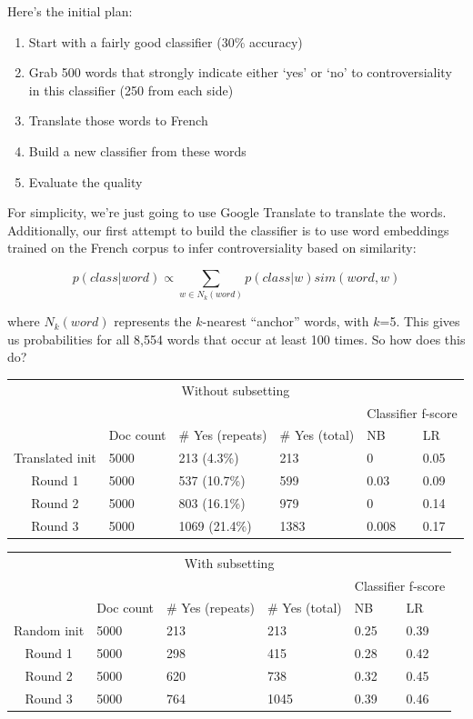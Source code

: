 \documentclass[11pt]{article} %
\begin{document}
Here's the initial plan:
\begin{enumerate}
\item Start with a fairly good classifier (30\% accuracy)
\item Grab 500 words that strongly indicate either `yes' or `no' to controversiality in this classifier (250 from each side) 
\item Translate those words to French
\item Build a new classifier from these words
\item Evaluate the quality
\end{enumerate}

For simplicity, we're just going to use Google Translate to translate the words. Additionally, our first attempt to build the classifier is to use word embeddings trained on the French corpus to infer controversiality based on similarity:

\[ p(class|word) \propto \sum_{w\in N_k(word)} p(class|w) sim(word,w) \]

where $N_k(word)$ represents the $k$-nearest ``anchor'' words, with $k$=5. This gives us probabilities for all 8,554 words that occur at least 100 times. So how does this do?\\

\begin{tabular}{|c|l|l|l|l|l|}
\multicolumn{6}{|c|}{Without subsetting} \\
\rowcolor{gray!50} &&&& \multicolumn{2}{|c|}{Classifier f-score} \\
\rowcolor{gray!50} & Doc count & \# Yes (repeats) & \# Yes (total) & NB & LR \\
Translated init & 5000 & 213 (4.3\%) & 213 & 0 & 0.05 \\
Round 1 & 5000 &  537 (10.7\%) & 599 & 0.03 & 0.09 \\
Round 2 & 5000 &  803 (16.1\%) & 979 & 0 & 0.14 \\
Round 3 & 5000 & 1069 (21.4\%) & 1383 & 0.008 & 0.17 \\
\end{tabular}
\quad
\begin{tabular}{|c|l|l|l|l|l|}
\multicolumn{6}{|c|}{With subsetting} \\
\rowcolor{gray!50} &&&& \multicolumn{2}{|c|}{Classifier f-score} \\
\rowcolor{gray!50} & Doc count & \# Yes (repeats) & \# Yes (total) & NB & LR \\
Random init & 5000 & 213 & 213 & 0.25 & 0.39 \\
Round 1 & 5000 & 298 & 415 & 0.28 & 0.42 \\
Round 2 & 5000 & 620 & 738 & 0.32 & 0.45 \\
Round 3 & 5000 & 764 & 1045 & 0.39 & 0.46 \\
\end{tabular} \\
\end{document}
